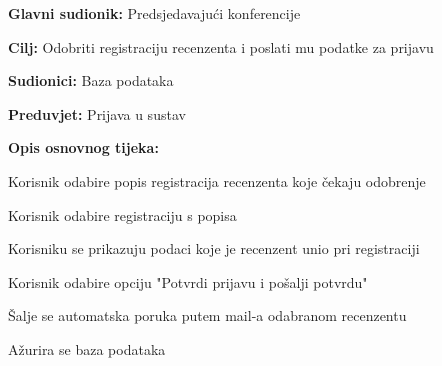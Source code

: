 					\noindent {}
					\begin{packed_item}
	
						\item \textbf{Glavni sudionik: } Predsjedavajući konferencije
						\item  \textbf{Cilj:} Odobriti registraciju recenzenta i poslati mu podatke za prijavu
						\item  \textbf{Sudionici:} Baza podataka
						\item  \textbf{Preduvjet:} Prijava u sustav
						\item  \textbf{Opis osnovnog tijeka:}
						
						\item[] \begin{packed_enum}
	
							\item Korisnik odabire popis registracija recenzenta koje čekaju odobrenje
							\item Korisnik odabire registraciju s popisa
							\item Korisniku se prikazuju podaci koje je recenzent unio pri registraciji
							\item Korisnik odabire opciju "Potvrdi prijavu i pošalji potvrdu"
							\item Šalje se automatska poruka putem mail-a odabranom recenzentu
							\item Ažurira se baza podataka

					
						\end{packed_enum}
			
					\end{packed_item}

